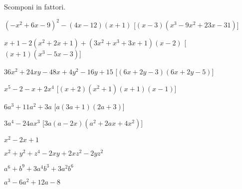 
\begin{esercizio}[\Ast]
 \label{ese:17.28}
 Scomponi in fattori.
 \begin{enumeratea}
\item $(-x^{2}+6x-9)^{2}-(4x-12)(x+1)$
  \hfill [$(x-3)(x^{3}-9x^{2}+23x-31)$]
\item $x+1-2(x^{2}+2x+1)+(3x^{2}+x^{3}+3x+1)(x-2)$
  \hfill [$(x+1)(x^{3}-5x-3)$]
\item $36x^{2}+24xy-48x+4y^{2}-16y+15$
  \hfill [$(6x+2y-3)(6x+2y-5)$]
\item $x^{5}-2-x+2x^{4}$
  \hfill [$(x+2)\left(x^{2}+1\right)(x+1)(x-1)$]
\item $6a^{3}+11a^{2}+3a$
  \hfill [$a(3a+1)(2a+3)$]
\item $3a^{4}-24ax^{3}$
  \hfill [$3a(a-2x)\left(a^{2}+2ax+4x^{2}\right)$]
\item $x^{2}-2x+1$
  \hfill 
\item $x^{2}+y^{2}+z^{4}-2xy+2{xz}^{2}-2{yz}^{2}$
  \hfill 
\item $a^{6}+b^{9}+3a^{4}b^{3}+3a^{2}b^{6}$
  \hfill 
\item $a^{3}-6a^{2}+12a-8$
  \hfill 
 \end{enumeratea}
\end{esercizio}

